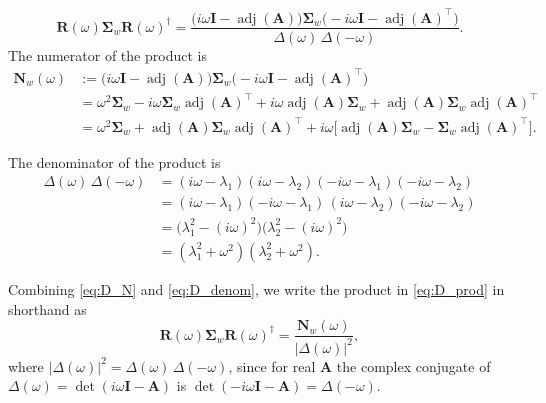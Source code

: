 \documentclass[12pt]{article}
\newcommand{\adj}{\operatorname{adj}}
\begin{document}
\begin{equation}
    \mathbf{R}(\omega)\boldsymbol\Sigma_w\mathbf{R}(\omega)^{\dagger}
    =\frac{\bigl(i\omega\mathbf{I}-\adj(\mathbf{A})\bigr)\boldsymbol\Sigma_w
    \bigl(-i\omega\mathbf{I}-\adj(\mathbf{A})^\top\bigr)}{\Delta(\omega)\,\Delta(-\omega)}.
    \label{eq:D_prod}
\end{equation}
The numerator of the product is
\begin{equation}
\begin{aligned}
    \mathbf{N}_w(\omega)
    &:=\bigl(i\omega\mathbf{I}-\adj(\mathbf{A})\bigr)\boldsymbol\Sigma_w
    \bigl(-i\omega\mathbf{I}-\adj(\mathbf{A})^\top\bigr)\\
    &=\omega^2\boldsymbol\Sigma_w-i\omega\boldsymbol\Sigma_w\adj(\mathbf A)^\top
    +i\omega\adj(\mathbf A)\boldsymbol\Sigma_w
    +\adj(\mathbf A)\boldsymbol\Sigma_w\adj(\mathbf A)^\top\\
    &=\omega^2\boldsymbol\Sigma_w+\adj(\mathbf A)\boldsymbol\Sigma_w\adj(\mathbf A)^\top
    +i\omega\bigl[\adj(\mathbf A)\boldsymbol\Sigma_w-\boldsymbol\Sigma_w\adj(\mathbf A)^\top\bigr].
\end{aligned}
    \label{eq:D_N}
\end{equation}

The denominator of the product is
\begin{equation}
\begin{aligned}
    \Delta(\omega)\,\Delta(-\omega)
    &=(i\omega-\lambda_1)(i\omega-\lambda_2)(-i\omega-\lambda_1)(-i\omega-\lambda_2)\\
    &=(i\omega-\lambda_1)(-i\omega-\lambda_1)\,(i\omega-\lambda_2)(-i\omega-\lambda_2)\\
    &=\bigl(\lambda_1^2-(i\omega)^2\bigr)\bigl(\lambda_2^2-(i\omega)^2\bigr)\\
    &=(\lambda_1^2+\omega^2)(\lambda_2^2+\omega^2).
\end{aligned}
    \label{eq:D_denom}
\end{equation}

Combining \eqref{eq:D_N} and \eqref{eq:D_denom}, we write the product in \eqref{eq:D_prod} in shorthand as
\begin{equation}
    \mathbf{R}(\omega)\boldsymbol\Sigma_w\mathbf{R}(\omega)^{\dagger}
    =\frac{\mathbf{N}_w(\omega)}{|\Delta(\omega)|^2},
    \label{eq:D_short}
\end{equation}
where $|\Delta(\omega)|^2=\Delta(\omega)\,\Delta(-\omega)$, since for real $\mathbf{A}$ the complex conjugate of
$\Delta(\omega)=\det(i\omega\mathbf{I}-\mathbf{A})$ is $\det(-i\omega\mathbf{I}-\mathbf{A})=\Delta(-\omega)$.
\end{document}
